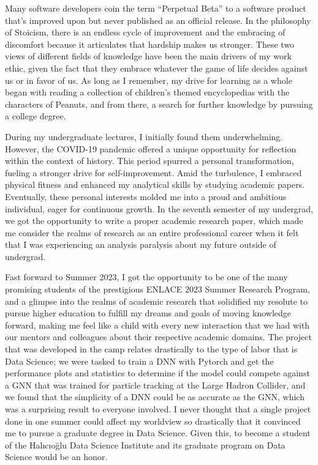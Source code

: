 	\noindent
	Many software developers coin the term “Perpetual Beta” to a software product that's improved upon but 
	never published as an official release. In the philosophy of Stoicism, there is an endless cycle of improvement 
	and the embracing of discomfort because it articulates that hardship makes us stronger. These two views of different 
	fields of knowledge have been the main drivers of my work ethic, given the fact that they embrace whatever the game 
	of life decides against us or in favor of us. As long as I remember, my drive for learning as a whole began with 
	reading a collection of children's themed encyclopedias with the characters of Peanuts, and from there, a search for 
	further knowledge by pursuing a college degree.
	
	\setlength{\parindent}{.3in}
	During my undergraduate lectures, I initially found them underwhelming. However, the COVID-19 pandemic offered a unique opportunity 
	for reflection within the context of history. This period spurred a personal transformation, fueling a stronger drive for self-improvement. 
	Amid the turbulence, I embraced physical fitness and enhanced my analytical skills by studying academic papers. Eventually, these
	personal interests molded me into a proud and ambitious individual, eager for continuous growth. In the seventh semester
	of my undergrad, we got the opportunity to write a proper academic research paper, which made me consider the realms of 
	research as an entire professional career when it felt that I was experiencing an analysis paralysis about my future outside of undergrad.
	
	Fast forward to Summer 2023, I got the opportunity to be one of the many promising students of the prestigious ENLACE 2023 Summer 
	Research Program, and a glimpse into the realms of academic research that solidified my resolute to pursue higher education to 
	fulfill my dreams and goals of moving knowledge forward, making me feel like a child with every new interaction that we 
	had with our mentors and colleagues about their respective academic domains. The project that was developed in the
	camp relates drastically to the type of labor that is Data Science; we were tasked to train a DNN with Pytorch and 
	get the performance plots and statistics to determine if the model could compete against a GNN that was trained for particle
	tracking at the Large Hadron Collider, and we found that the simplicity of a DNN could be as accurate as the GNN, which was a surprising
	result to everyone involved. I never thought that a single project done in one summer could affect my worldview so 
	drastically that it convinced me to pursue a graduate degree in Data Science. Given this, to become
	a student of the Halıcıoğlu Data Science Institute and its graduate program on Data Science would be an honor.
	
